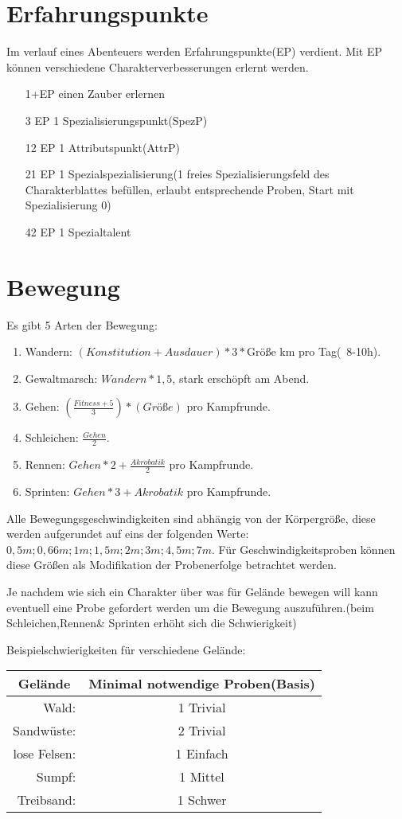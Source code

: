 \section{Erfahrungspunkte}
Im verlauf eines Abenteuers werden Erfahrungspunkte(EP) verdient. Mit EP können verschiedene Charakterverbesserungen erlernt werden.
\begin{enumerate}
\item[1+EP] einen Zauber erlernen
\item[3 EP] 1 Spezialisierungspunkt(SpezP)
\item[12 EP] 1 Attributspunkt(AttrP)
\item[21 EP] 1 Spezialspezialisierung(1 freies Spezialisierungsfeld des Charakterblattes befüllen, erlaubt entsprechende Proben, Start mit Spezialisierung 0)
\item[42 EP] 1 Spezialtalent
\end{enumerate}
	
\section{Bewegung}
Es gibt 5 Arten der Bewegung:
\begin{enumerate}
\item Wandern: $(Konstitution + Ausdauer) * 3 * $Größe km pro Tag(~8-10h).
\item Gewaltmarsch: $Wandern * 1,5$, stark erschöpft am Abend.
\item Gehen: $(\frac{Fitness + 5}{3}) * (Größe)$ pro Kampfrunde.
\item Schleichen: $\frac{Gehen}{2}$.
\item Rennen: $Gehen * 2 + \frac{Akrobatik}{2}$ pro Kampfrunde.
\item Sprinten: $Gehen * 3 + Akrobatik$ pro Kampfrunde.
\end{enumerate}
Alle Bewegungsgeschwindigkeiten sind abhängig von der Körpergröße, diese werden aufgerundet auf eins der folgenden Werte: $0,5m; 0,66m; 1m; 1,5m; 2m; 3m; 4,5m; 7m$. Für Geschwindigkeitsproben können diese Größen als Modifikation der Probenerfolge betrachtet werden.

Je nachdem wie sich ein Charakter über was für Gelände bewegen will kann eventuell eine Probe gefordert werden um die Bewegung auszuführen.(beim Schleichen,Rennen\& Sprinten erhöht sich die Schwierigkeit)

Beispielschwierigkeiten für verschiedene Gelände:
\begin{tabular}{rc}
\multicolumn{1}{c}{Gelände} & Minimal notwendige Proben(Basis)\\
\hline
Wald: & 1 Trivial\\
Sandwüste: & 2 Trivial\\
lose Felsen: & 1 Einfach\\
Sumpf: & 1 Mittel\\
Treibsand: & 1 Schwer\\
\end{tabular}

